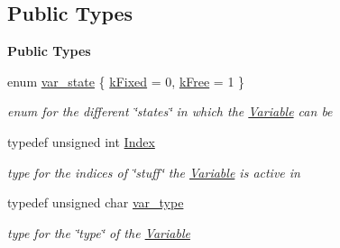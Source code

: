 \subsection*{Public Types}
\begin{Indent}\textbf{ Public Types}\par
\begin{DoxyCompactItemize}
\item 
enum \mbox{\hyperlink{class_s_m_spp__di__unipi__it_1_1_variable_a30febf04ce89c19659143fa83ae6f7ba}{var\+\_\+state}} \{ \mbox{\hyperlink{class_s_m_spp__di__unipi__it_1_1_variable_a30febf04ce89c19659143fa83ae6f7baaf0cb52fcb65ba1ee2e93ef655d5c7693}{k\+Fixed}} = 0, 
\mbox{\hyperlink{class_s_m_spp__di__unipi__it_1_1_variable_a30febf04ce89c19659143fa83ae6f7baa215574cae9a84b3151d2fb68d4c4d9d1}{k\+Free}} = 1
 \}
\begin{DoxyCompactList}\small\item\em enum for the different \char`\"{}states\char`\"{} in which the \mbox{\hyperlink{class_s_m_spp__di__unipi__it_1_1_variable}{Variable}} can be \end{DoxyCompactList}\item 
\mbox{\label{class_s_m_spp__di__unipi__it_1_1_variable_ad53d6229d7ec28555a9c9c2fd9abf773}} 
typedef unsigned int \mbox{\hyperlink{class_s_m_spp__di__unipi__it_1_1_variable_ad53d6229d7ec28555a9c9c2fd9abf773}{Index}}
\begin{DoxyCompactList}\small\item\em type for the indices of \char`\"{}stuff\char`\"{} the \mbox{\hyperlink{class_s_m_spp__di__unipi__it_1_1_variable}{Variable}} is active in \end{DoxyCompactList}\item 
\mbox{\label{class_s_m_spp__di__unipi__it_1_1_variable_a32378add5594ab0f1fb45e711d88924d}} 
typedef unsigned char \mbox{\hyperlink{class_s_m_spp__di__unipi__it_1_1_variable_a32378add5594ab0f1fb45e711d88924d}{var\+\_\+type}}
\begin{DoxyCompactList}\small\item\em type for the \char`\"{}type\char`\"{} of the \mbox{\hyperlink{class_s_m_spp__di__unipi__it_1_1_variable}{Variable}} \end{DoxyCompactList}\end{DoxyCompactItemize}
\end{Indent}
